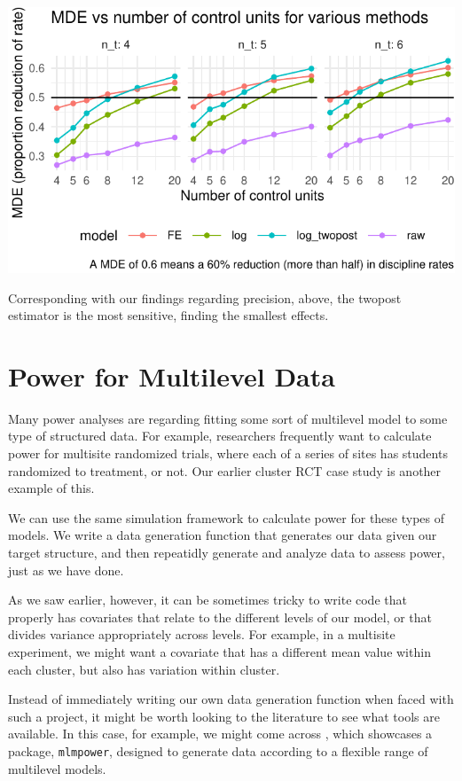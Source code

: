 \documentclass[
]{book}
\begin{document}
\begin{center}\includegraphics[width=0.75\linewidth]{Designing-Simulations-in-R_files/figure-latex/disc_mde-1} \end{center}

Corresponding with our findings regarding precision, above, the twopost estimator is the most sensitive, finding the smallest effects.

\section{Power for Multilevel Data}\label{power-for-multilevel-data}

Many power analyses are regarding fitting some sort of multilevel model to some type of structured data.
For example, researchers frequently want to calculate power for multisite randomized trials, where each of a series of sites has students randomized to treatment, or not.
Our earlier cluster RCT case study is another example of this.

We can use the same simulation framework to calculate power for these types of models.
We write a data generation function that generates our data given our target structure, and then repeatidly generate and analyze data to assess power, just as we have done.

As we saw earlier, however, it can be sometimes tricky to write code that properly has covariates that relate to the different levels of our model, or that divides variance appropriately across levels.
For example, in a multisite experiment, we might want a covariate that has a different mean value within each cluster, but also has variation within cluster.

Instead of immediately writing our own data generation function when faced with such a project, it might be worth looking to the literature to see what tools are available.
In this case, for example, we might come across \citet{enders2023simple}, which showcases a package, \texttt{mlmpower}, designed to generate data according to a flexible range of multilevel models.
\end{document}
